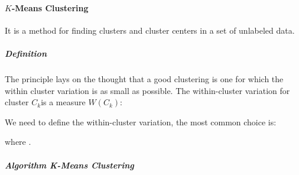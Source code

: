 \paragraph{$K$-Means Clustering}
It is a method for finding clusters and cluster centers in a set of unlabeled data. 
\subparagraph{Definition}
The principle lays on the thought that a good clustering is one for
which the within cluster variation is as small as possible. The
within-cluster variation for cluster $C_{k}$is a measure $W(C_{k})$:
\begin{center}
\end{center}
We need to define the within-cluster variation, the most common choice
is:
\begin{center}
\end{center}
where .

\subparagraph{Algorithm K-Means Clustering}

